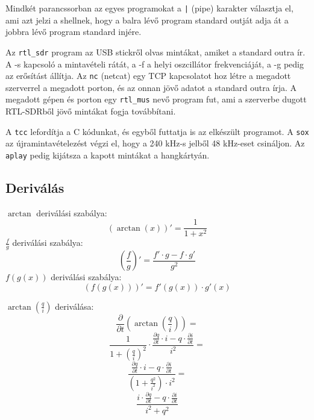 \documentclass[12pt,a4paper]{article}
\begin{document}
Mindkét parancssorban az egyes programokat a \texttt{|} (pipe) karakter választja el, ami azt jelzi a shellnek,
hogy a balra lévő program standard outját adja át a jobbra lévő program standard injére.

Az \texttt{rtl\_sdr} program az USB stickről olvas mintákat, amiket a standard outra ír. A -s kapcsoló a mintavételi rátát, a -f a helyi oszcillátor frekvenciáját, a -g pedig az erősítást állítja.
Az \texttt{nc} (netcat) egy TCP kapcsolatot hoz létre a megadott szerverrel a megadott porton, és az onnan jövő adatot a standard outra írja.
A megadott gépen és porton egy \texttt{rtl\_mus} nevő program fut, ami a szerverbe dugott RTL-SDRből jövő mintákat fogja továbbítani.

A \texttt{tcc} lefordítja a C kódunkat, és egyből futtatja is az elkészült programot.
A \texttt{sox} az újramintavételezést végzi el, hogy a 240 kHz-s jelből 48 kHz-eset csináljon.
Az \texttt{aplay} pedig kijátsza a kapott mintákat a hangkártyán.


\subsection{Deriválás}

$\arctan$ deriválási szabálya:
\begin{equation}
\left( \arctan \left( x \right) \right)' = \frac{1}{1 + x^2}
\end{equation}
$\frac{f}{g}$ deriválási szabálya:
\begin{equation}
\left( \frac{f}{g} \right)' = \frac{ f' \cdot g - f  \cdot  g'}{g^2}
\end{equation}
$f(g(x))$ deriválási szabálya:
\begin{equation}
\left( f(g(x)) \right)' = f'(g(x)) \cdot g'(x)
\end{equation}
\vspace{20pt}

$\arctan \left( \frac{q}{i} \right)$ deriválása:
\begin{equation}
\frac{\partial}{\partial t}\left( \arctan \left( \frac{q}{i} \right) \right) = 
\end{equation}
\begin{equation}
\frac{1}{1 + \left( \frac{q}{i} \right)^2} \cdot \frac{\frac{\partial q}{\partial t} \cdot i - q  \cdot \frac{\partial i}{\partial t}}{i^2} =
\end{equation}
\begin{equation}
\frac{\frac{\partial q}{\partial t} \cdot i - q  \cdot \frac{\partial i}{\partial t}}{\left( 1 + \frac{q^2}{i^2} \right) \cdot i^2 } 
=
\end{equation}
\begin{equation}
\frac{i \cdot \frac{\partial q}{\partial t} - q \cdot \frac{\partial i}{\partial t}}{i^2 + q^2}
\end{equation}
\end{document}
